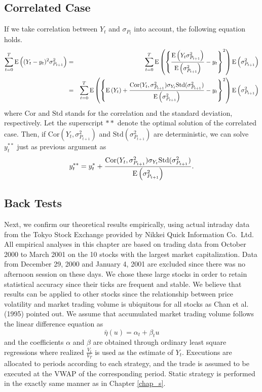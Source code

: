 \subsection{Correlated Case}\label{sec_d32}
If we take correlation between $Y_t$ and $\sigma_{P_t}$ into account, the 
following equation holds.
\begin{eqnarray*}\label{eq_d29}
  \sum_{t=0}^T {\mathrm{E}}\left( (Y_t-y_t)^2 \sigma_{P_{t+1}}^2 \right)
  & = & \sum_{t=0}^T 
{\mathrm{E}}\left( \left\{\frac{{\mathrm{E}}\left( Y_t\sigma_{P_{t+1}}^2 \right)}{{\mathrm{E}}\left( \sigma_{P_{t+1}}^2 \right)}-
y_t\right\}^2  \right){\mathrm{E}}\left( \sigma_{P_{t+1}}^2 \right) \nonumber \\
  & = & \sum_{t=0}^T 
{\mathrm{E}}\left( \left\{{\mathrm{E}}\left( Y_t \right)+\frac{\mbox{Cor}(Y_t,\sigma_{P_{t+1}}^2)\sigma_{Y_t} 
\mbox{Std}(\sigma_{P_{t+1}}^2)}{{\mathrm{E}}\left( \sigma_{P_{t+1}}^2 \right)}-y_t\right\}^2  \right) 
{\mathrm{E}}\left( \sigma_{P_{t+1}}^2 \right)
\end{eqnarray*}
where $\mbox{Cor}$ and $\mbox{Std}$ stands for the correlation and the standard 
deviation, respectively.  Let the superscript $**$ denote the optimal solution 
of the correlated case.  Then, if $\mbox{Cor}(Y_t,\sigma_{P_{t+1}}^2)$ and 
$\mbox{Std}(\sigma_{P_{t+1}}^2)$ are deterministic, we can solve $y_t^{**}$ just 
as previous argument as
\[ %
y_t^{**}=y_t^*+\frac{\mbox{Cor}(Y_t,\sigma_{P_{t+1}}^2)\sigma_{Y_t}\mbox{Std}
(\sigma_{P_{t+1}}^2)}{\ex{\sigma_{P_{t+1}}^2}}.
\] %

\subsection{Back Tests}
Next, we confirm our theoretical results empirically, using actual intraday data 
from the Tokyo Stock Exchange provided by Nikkei Quick Information Co.~Ltd.  All 
empirical analyses in this chapter are based on trading data from October 2000 
to March 2001 on the 10 stocks with the largest market capitalization.  Data 
from December 29, 2000 and January 4, 2001 are excluded since there was no 
afternoon session on these days.  We chose these large stocks in order to retain 
statistical accuracy since their ticks are frequent and stable.  We believe that 
results can be applied to other stocks since the relationship between price 
volatility and market trading volume is ubiquitous for all stocks as Chan et al. 
(1995) pointed out.  We assume that accumulated market trading volume follows 
the linear difference equation as 
\[ %
  \bar \eta(u)=\alpha_t+\beta_t u
\] %
and the coefficients $\alpha$ and $\beta$ are obtained through ordinary least 
square regressions where realized $\displaystyle \frac{V_t}{V_T}$ is used as the 
estimate of $Y_t$.  Executions are allocated to periods according to each 
strategy, and the trade is assumed to be executed at the VWAP of the 
corresponding period.  Static strategy is performed in the exactly same manner 
as in Chapter \ref{chap_s}.

